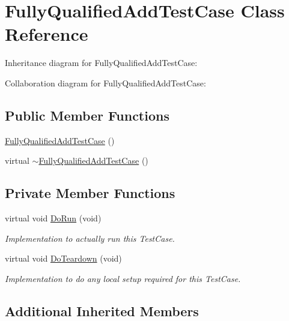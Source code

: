 \hypertarget{classFullyQualifiedAddTestCase}{}\section{Fully\+Qualified\+Add\+Test\+Case Class Reference}
\label{classFullyQualifiedAddTestCase}


Inheritance diagram for Fully\+Qualified\+Add\+Test\+Case\+:


Collaboration diagram for Fully\+Qualified\+Add\+Test\+Case\+:
\subsection*{Public Member Functions}
\begin{DoxyCompactItemize}
\item 
\hyperlink{classFullyQualifiedAddTestCase_ab890787154c56ba8f5496c808123f7fa}{Fully\+Qualified\+Add\+Test\+Case} ()
\item 
virtual \hyperlink{classFullyQualifiedAddTestCase_adaa42ac855fb9ce6eeb95e7a23db80cc}{$\sim$\+Fully\+Qualified\+Add\+Test\+Case} ()
\end{DoxyCompactItemize}
\subsection*{Private Member Functions}
\begin{DoxyCompactItemize}
\item 
virtual void \hyperlink{classFullyQualifiedAddTestCase_a6b8576f97ce2fc22466f08977ac3b254}{Do\+Run} (void)
\begin{DoxyCompactList}\small\item\em Implementation to actually run this Test\+Case. \end{DoxyCompactList}\item 
virtual void \hyperlink{classFullyQualifiedAddTestCase_a65af8ed6007312fd76dfd059be757fec}{Do\+Teardown} (void)
\begin{DoxyCompactList}\small\item\em Implementation to do any local setup required for this Test\+Case. \end{DoxyCompactList}\end{DoxyCompactItemize}
\subsection*{Additional Inherited Members}


